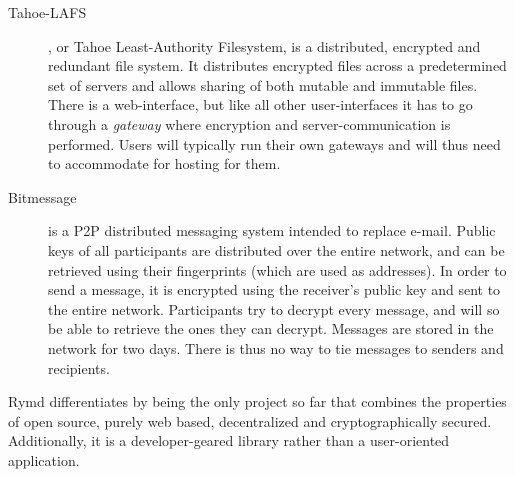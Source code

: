 \begin{description}
  \item[Tahoe-LAFS] \cite{Tahoe:2014:Online}, or Tahoe Least-Authority Filesystem, is a distributed, encrypted and redundant file system. It distributes encrypted files across a predetermined set of servers and allows sharing of both mutable and immutable files. There is a web-interface, but like all other user-interfaces it has to go through a \emph{gateway} where encryption and server-communication is performed. Users will typically run their own gateways and will thus need to accommodate for hosting for them.
  \item[Bitmessage] \cite{Bitmessage:2014:Online} is a P2P distributed messaging system intended to replace e-mail. Public keys of all participants are distributed over the entire network, and can be retrieved using their fingerprints (which are used as addresses). In order to send a message, it is encrypted using the receiver's public key and sent to the entire network. Participants try to decrypt every message, and will so be able to retrieve the ones they can decrypt. Messages are stored in the network for two days. There is thus no way to tie messages to senders and recipients.

\end{description}

Rymd differentiates by being the only project so far that combines the properties of open source, purely web based, decentralized and cryptographically secured. Additionally, it is a developer-geared library rather than a user-oriented application.
